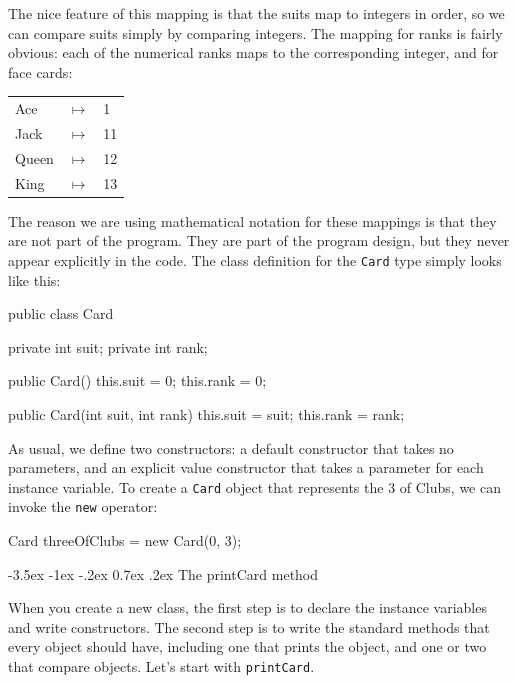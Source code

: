 \documentclass[12pt]{book}
\makeatletter
\theoremstyle{exercise}
\newcommand{\java}[1]{\verb"#1"}
\renewcommand{\section}{\@startsection {section}{1}{\z@}%
    {-3.5ex \@plus -1ex \@minus -.2ex}%
    {0.7ex \@plus.2ex}%
    {\normalfont\Large\bfseries}}
\newcommand{\java}[1]{\lstinline{#1}} %
\makeatother
\begin{document}
The nice feature of this mapping is that the suits map to integers in order, so we can compare suits simply by comparing integers.
The mapping for ranks is fairly obvious: each of the numerical ranks maps to the corresponding integer, and for face cards:

\begin{tabular}{l c l}
Ace & $\mapsto$ & 1 \\
Jack & $\mapsto$ & 11 \\
Queen & $\mapsto$ & 12 \\
King & $\mapsto$ & 13 \\
\end{tabular}

The reason we are using mathematical notation for these mappings is that they are not part of the program.
They are part of the program design, but they never appear explicitly in the code.
The class definition for the \java{Card} type simply looks like this:

\begin{code}
public class Card {
    private int suit;
    private int rank;

    public Card() {
        this.suit = 0;
        this.rank = 0;
    }

    public Card(int suit, int rank) {
        this.suit = suit;
        this.rank = rank;
    }
}
\end{code}


As usual, we define two constructors: a default constructor that takes no parameters, and an explicit value constructor that takes a parameter for each instance variable.
To create a \java{Card} object that represents the 3 of Clubs, we can invoke the \java{new} operator:

\begin{code}
    Card threeOfClubs = new Card(0, 3);
\end{code}



\section{The printCard method}
\label{printcard}


When you create a new class, the first step is to declare the instance variables and write constructors.
The second step is to write the standard methods that every object should have, including one that prints the object, and one or two that compare objects.
Let's start with \java{printCard}.
\end{document}

